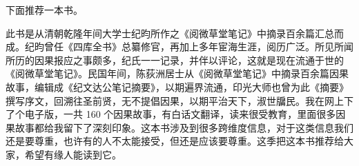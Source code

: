 下面推荐一本书。

\begin{book}[《纪文达公笔记摘要》]
    此书是从清朝乾隆年间大学士纪昀所作之《阅微草堂笔记》中摘录百余篇汇总而成。纪昀曾任《四库全书》总纂修官，再加上多年宦海生涯，阅历广泛。所见所闻所历的因果报应之事颇多，纪氏一一记录，并伴以评论，这就是现在流通于世的《阅微草堂笔记》。民国年间，陈荻洲居士从《阅微草堂笔记》中摘录百余篇因果故事，编辑成《纪文达公笔记摘要》，以期遍界流通，印光大师也曾为此《摘要》撰写序文，回溯往圣前贤，无不提倡因果，以期平治天下，淑世牖民。我在网上下了个电子版，一共 160 个因果故事，有白话文翻译，读来很受教育，里面很多因果故事都给我留下了深刻印象。这本书涉及到很多跨维度信息，对于这类信息我们还是要尊重，也许有的人不太能接受，但还是应该要尊重。这季把这本书推荐给大家，希望有缘人能读到它。
\end{book}
